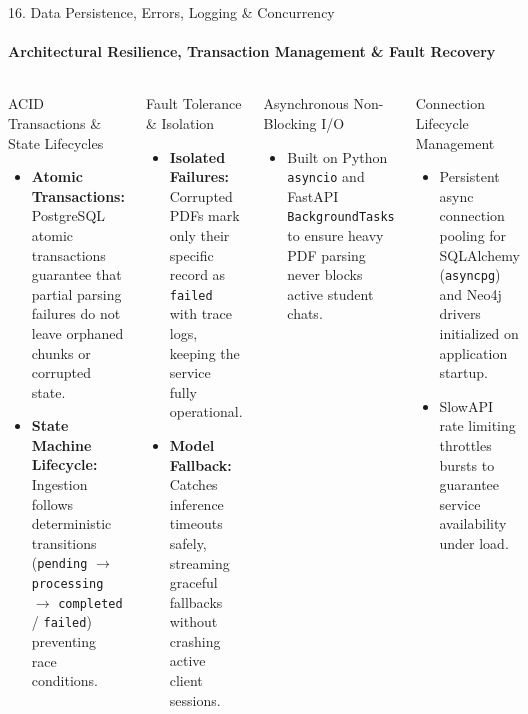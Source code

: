 \documentclass[aspectratio=169, 11pt]{beamer}
\begin{document}
\begin{frame}{16. Data Persistence, Errors, Logging \& Concurrency}
    \framesubtitle{Architectural Resilience, Transaction Management \& Fault Recovery}
    \begin{columns}[T]
        \begin{block}{ACID Transactions \& State Lifecycles}
            \footnotesize
            \begin{itemize}
                \item \textbf{Atomic Transactions:} PostgreSQL atomic transactions guarantee that partial parsing failures do not leave orphaned chunks or corrupted state.
                \item \textbf{State Machine Lifecycle:} Ingestion follows deterministic transitions (\texttt{pending} $\rightarrow$ \texttt{processing} $\rightarrow$ \texttt{completed} / \texttt{failed}) preventing race conditions.
            \end{itemize}
        \end{block}

        \begin{block}{Fault Tolerance \& Isolation}
            \footnotesize
            \begin{itemize}
                \item \textbf{Isolated Failures:} Corrupted PDFs mark only their specific record as \texttt{failed} with trace logs, keeping the service fully operational.
                \item \textbf{Model Fallback:} Catches inference timeouts safely, streaming graceful fallbacks without crashing active client sessions.
            \end{itemize}
        \end{block}

        \begin{block}{Asynchronous Non-Blocking I/O}
            \footnotesize
            \begin{itemize}
                \item Built on Python \texttt{asyncio} and FastAPI \texttt{BackgroundTasks} to ensure heavy PDF parsing never blocks active student chats.
            \end{itemize}
        \end{block}

        \begin{block}{Connection Lifecycle Management}
            \footnotesize
            \begin{itemize}
                \item Persistent async connection pooling for SQLAlchemy (\texttt{asyncpg}) and Neo4j drivers initialized on application startup.
                \item SlowAPI rate limiting throttles bursts to guarantee service availability under load.
            \end{itemize}
        \end{block}
    \end{columns}
\end{frame}
\end{document}
